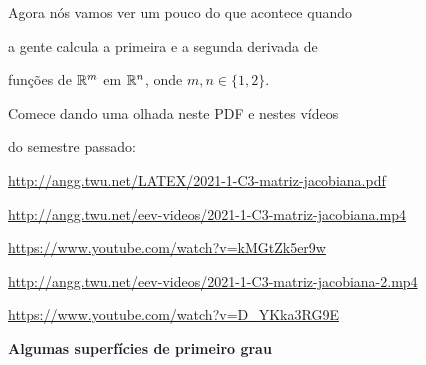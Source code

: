 \documentclass[oneside,12pt]{article}
\begin{document}
\msk

Agora nós vamos ver um pouco do que acontece quando

a gente calcula a primeira e a segunda derivada de

funções de $\mathbb{R}^m$ em $\mathbb{R}^n$, onde $m,n∈\{1,2\}$.

\bsk

Comece dando uma olhada neste PDF e nestes vídeos

do semestre passado:




{\footnotesize

\url{http://angg.twu.net/LATEX/2021-1-C3-matriz-jacobiana.pdf}

\ssk

\url{http://angg.twu.net/eev-videos/2021-1-C3-matriz-jacobiana.mp4}

\url{https://www.youtube.com/watch?v=kMGtZk5er9w}

\ssk

\url{http://angg.twu.net/eev-videos/2021-1-C3-matriz-jacobiana-2.mp4}

\url{https://www.youtube.com/watch?v=D_YKka3RG9E}

\ssk


}



\newpage

{\bf Algumas superfícies de primeiro grau}


\end{document}
